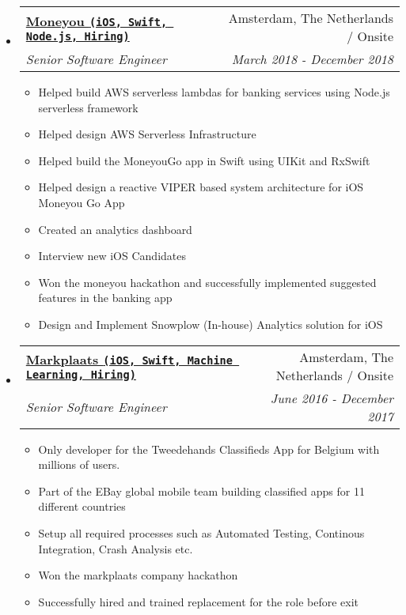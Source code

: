 \documentclass[letterpaper,11pt]{article}
\makeatletter
\newcommand{\resitem}[1]{\item #1 \vspace{-2pt}}
\newcommand{\ressubheading}[4]{
\begin{tabular*}{7.0in}{l@{\extracolsep{\fill}}r}
    \textbf{#1} & #2 \\
    \textit{#3} & \textit{#4} \\
\end{tabular*}\vspace{-6pt}}
\makeatother
\begin{document}
\begin{itemize}
    
\item
    \ressubheading{\href{https://www.moneyou.nl/}{Moneyou \texttt{(iOS, Swift, Node.js, Hiring)}}}{Amsterdam, The Netherlands / Onsite}{Senior Software Engineer}{March 2018 - December 2018}
    \begin{itemize}
        \resitem{Helped build AWS serverless lambdas for banking services using Node.js serverless framework}
        \resitem{Helped design AWS Serverless Infrastructure}
        \resitem{Helped build the MoneyouGo app in Swift using UIKit and RxSwift}
        \resitem{Helped design a reactive VIPER based system architecture for iOS Moneyou Go App}
        \resitem{Created an analytics dashboard}
        \resitem{Interview new iOS Candidates}
        \resitem{Won the moneyou hackathon and successfully implemented suggested features in the banking app}
        \resitem{Design and Implement Snowplow (In-house) Analytics solution for iOS}
    \end{itemize}

\vspace{0.1in}
    
\item
    \ressubheading{\href{https://www.markplaats.nl/}{Markplaats \texttt{(iOS, Swift, Machine Learning, Hiring)}}}{Amsterdam, The Netherlands / Onsite}{Senior Software Engineer}{June 2016 - December 2017}
    \begin{itemize}
        \resitem{Only developer for the Tweedehands Classifieds App for Belgium with millions of users.}
        \resitem{Part of the EBay global mobile team building classified apps for 11 different countries}
        \resitem{Setup all required processes such as Automated Testing, Continous Integration, Crash Analysis etc.}
        \resitem{Won the markplaats company hackathon}
        \resitem{Successfully hired and trained replacement for the role before exit}
    \end{itemize}


\end{itemize}

\vspace{0.3in}
\end{document}

